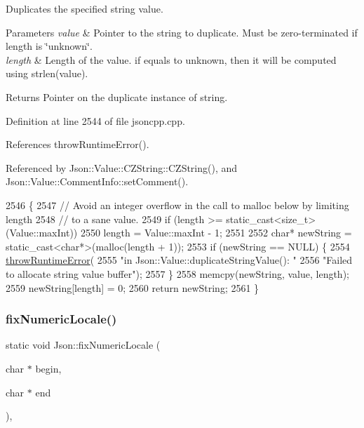 Duplicates the specified string value. 
\begin{DoxyParams}{Parameters}
{\em value} & Pointer to the string to duplicate. Must be zero-\/terminated if length is \char`\"{}unknown\char`\"{}. \\
\hline
{\em length} & Length of the value. if equals to unknown, then it will be computed using strlen(value). \\
\hline
\end{DoxyParams}
\begin{DoxyReturn}{Returns}
Pointer on the duplicate instance of string. 
\end{DoxyReturn}


Definition at line 2544 of file jsoncpp.\+cpp.



References throw\+Runtime\+Error().



Referenced by Json\+::\+Value\+::\+C\+Z\+String\+::\+C\+Z\+String(), and Json\+::\+Value\+::\+Comment\+Info\+::set\+Comment().


\begin{DoxyCode}
2546 \{
2547   \textcolor{comment}{// Avoid an integer overflow in the call to malloc below by limiting length}
2548   \textcolor{comment}{// to a sane value.}
2549   \textcolor{keywordflow}{if} (length >= static\_cast<size\_t>(Value::maxInt))
2550     length = Value::maxInt - 1;
2551 
2552   \textcolor{keywordtype}{char}* newString = \textcolor{keyword}{static\_cast<}\textcolor{keywordtype}{char}*\textcolor{keyword}{>}(malloc(length + 1));
2553   \textcolor{keywordflow}{if} (newString == NULL) \{
2554     \hyperlink{namespace_json_a0ab7ff7f99788262d92d9ff3d924e065}{throwRuntimeError}(
2555         \textcolor{stringliteral}{"in Json::Value::duplicateStringValue(): "}
2556         \textcolor{stringliteral}{"Failed to allocate string value buffer"});
2557   \}
2558   memcpy(newString, value, length);
2559   newString[length] = 0;
2560   \textcolor{keywordflow}{return} newString;
2561 \}
\end{DoxyCode}
\mbox{\label{namespace_json_aa208904144dc7b11ccc28f47c9afab9a}} 
\subsubsection{\texorpdfstring{fix\+Numeric\+Locale()}{fixNumericLocale()}}
{\footnotesize\ttfamily static void Json\+::fix\+Numeric\+Locale (\begin{DoxyParamCaption}\item[{char $\ast$}]{begin,  }\item[{char $\ast$}]{end }\end{DoxyParamCaption})\hspace{0.3cm}{\ttfamily [inline]}, {\ttfamily [static]}}

